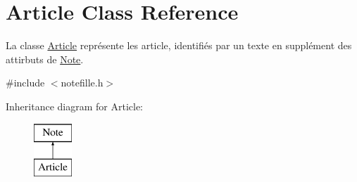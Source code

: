 \hypertarget{classArticle}{}\section{Article Class Reference}
\label{classArticle}


La classe \hyperlink{classArticle}{Article} représente les article, identifiés par un texte en supplément des attirbuts de \hyperlink{classNote}{Note}.  




{\ttfamily \#include $<$notefille.\+h$>$}

Inheritance diagram for Article\+:\begin{figure}[H]
\begin{center}
\leavevmode
\includegraphics[height=2.000000cm]{classArticle}
\end{center}
\end{figure}
